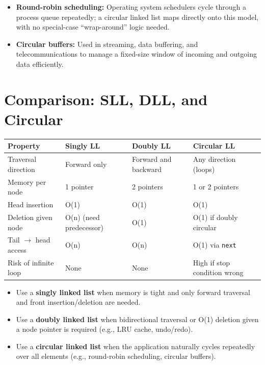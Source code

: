 \documentclass[11pt, a4paper, notitlepage]{report}
\theoremstyle{definition}
\theoremstyle{remark}
\theoremstyle{definition}
\begin{document}
\begin{itemize}
  \item \textbf{Round-robin scheduling:} Operating system schedulers cycle
        through a process queue repeatedly; a circular linked list maps
        directly onto this model, with no special-case ``wrap-around'' logic
        needed.
  \item \textbf{Circular buffers:} Used in streaming, data buffering, and
        telecommunications to manage a fixed-size window of incoming and
        outgoing data efficiently.
\end{itemize}

\section{Comparison: SLL, DLL, and Circular}
\label{sec:ll-comparison2}

\begin{center}
\begin{tabularx}{\linewidth}{lXXX}
\toprule
\textbf{Property} & \textbf{Singly LL} & \textbf{Doubly LL} & \textbf{Circular LL} \\
\midrule
Traversal direction & Forward only & Forward and backward & Any direction (loops) \\
Memory per node     & 1 pointer & 2 pointers & 1 or 2 pointers \\
Head insertion      & O(1) & O(1) & O(1) \\
Deletion given node & O(n) (need predecessor) & O(1) & O(1) if doubly circular \\
Tail $\to$ head access & O(n) & O(n) & O(1) via \texttt{next} \\
Risk of infinite loop & None & None & High if stop condition wrong \\
\bottomrule
\end{tabularx}
\end{center}

\begin{keyresult}[title={Key Result: Choosing the Right Variant}]
\begin{itemize}
  \item Use a \textbf{singly linked list} when memory is tight and only forward
        traversal and front insertion/deletion are needed.
  \item Use a \textbf{doubly linked list} when bidirectional traversal or O(1)
        deletion given a node pointer is required (e.g., LRU cache, undo/redo).
  \item Use a \textbf{circular linked list} when the application naturally
        cycles repeatedly over all elements (e.g., round-robin scheduling,
        circular buffers).
\end{itemize}
\end{keyresult}
\end{document}
